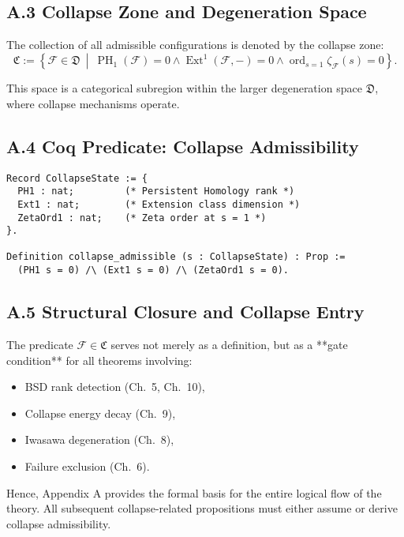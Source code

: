 \documentclass[11pt]{article}
\DeclareMathOperator{\Ext}{Ext}
\DeclareMathOperator{\PH}{PH}
\newcommand{\ord}{\operatorname{ord}}
\begin{document}
\subsection*{A.3 Collapse Zone and Degeneration Space}

The collection of all admissible configurations is denoted by the collapse zone:
\[
\mathfrak{C} := \left\{ \mathcal{F} \in \mathfrak{D} \ \middle| \ 
\PH_1(\mathcal{F}) = 0 \land \Ext^1(\mathcal{F}, -) = 0 \land \ord_{s=1} \zeta_{\mathcal{F}}(s) = 0 \right\}.
\]

This space is a categorical subregion within the larger degeneration space \( \mathfrak{D} \), where collapse mechanisms operate.

\subsection*{A.4 Coq Predicate: Collapse Admissibility}
\begin{lstlisting}[language=Coq]
Record CollapseState := {
  PH1 : nat;         (* Persistent Homology rank *)
  Ext1 : nat;        (* Extension class dimension *)
  ZetaOrd1 : nat;    (* Zeta order at s = 1 *)
}.

Definition collapse_admissible (s : CollapseState) : Prop :=
  (PH1 s = 0) /\ (Ext1 s = 0) /\ (ZetaOrd1 s = 0).
\end{lstlisting}

\subsection*{A.5 Structural Closure and Collapse Entry}

The predicate \( \mathcal{F} \in \mathfrak{C} \) serves not merely as a definition, but as a **gate condition** for all theorems involving:
\begin{itemize}
  \item BSD rank detection (Ch.~5, Ch.~10),
  \item Collapse energy decay (Ch.~9),
  \item Iwasawa degeneration (Ch.~8),
  \item Failure exclusion (Ch.~6).
\end{itemize}

Hence, Appendix A provides the formal basis for the entire logical flow of the theory. All subsequent collapse-related propositions must either assume or derive collapse admissibility.



\appendix
\end{document}

